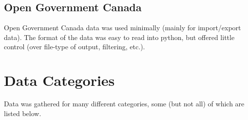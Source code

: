 \documentclass{article}
\begin{document}
\subsection{Open Government Canada}

Open Government Canada data was used minimally (mainly for import/export data). The format of the data was easy to read into python, but offered little control (over file-type of output, filtering, etc.).

\section{Data Categories}

Data was gathered for many different categories, some (but not all) of which are listed below.
\end{document}
